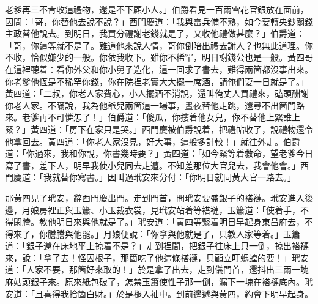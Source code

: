 老爹再三不肯收這禮物，還是不下顧小人。」伯爵看見一百兩雪花官銀放在面前，因問：「哥，你替他去說不說？」西門慶道：「我與雷兵備不熟，如今要轉央鈔關錢主政替他說去。到明日，我買分禮謝老錢就是了，又收他禮做甚麼？」伯爵道：「哥，你這等就不是了。難道他來說人情，哥你倒陪出禮去謝人？也無此道理。你不收，恰似嫌少的一般。你依我收下。雖你不稀罕，明日謝錢公也是一般。黃四哥在這裡聽着：看你外父和你小舅子造化，這一回求了書去，難得兩箇都沒事出來。你老爹他恆是不稀罕你錢，你在院裡老實大大擺一席酒，請俺們耍一日就是了。」{}黃四道：「二叔，你老人家費心，小人擺酒不消說，還叫俺丈人買禮來，磕頭酬謝你老人家。不瞞說，我為他爺兒兩箇這一場事，晝夜替他走跳，還尋不出箇門路來。老爹再不可憐怎了！」伯爵道：「傻瓜，你摟着他女兒，你不替他上緊誰上緊？」{}黃四道：「房下在家只是哭。」西門慶被伯爵說着，把禮帖收了，說禮物還令他拿回去。{}黃四道：「你老人家沒見，好大事，這般多計較！」就往外走。伯爵道：「你過來，我和你說，你書幾時要？」黃四道：「如今緊等着救命，望老爹今日寫了書，差下人，明早我使小兒同去走遭。不知差那位大官兒去，我會他會。」西門慶道：「我就替你寫書。」因叫過玳安來分付：「你明日就同黃大官一路去。」

那黃四見了玳安，辭西門慶出門。走到門首，問玳安要盛銀子的褡褳。玳安進入後邊，月娘房裡正與玉簫、小玉裁衣裳，見玳安站着等褡褳，玉簫道：「使着手，不得閑謄。教他明日來與他就是了。」玳安道：「黃四等緊着明日早起身東昌府去，不得來了，你謄謄與他罷。」月娘便說：「你拿與他就是了，只教人家等着。」玉簫道：「銀子還在床地平上掠着不是？」走到裡間，把銀子往床上只一倒，掠出褡褳來，說：「拿了去！怪囚根子，那箇吃了他這條褡褳，只顧立叮螞蝗的要！」玳安道：「人家不要，那箇好來取的！」於是拿了出去，走到儀門首，還抖出三兩一塊麻姑頭銀子來。{}原來紙包破了，怎禁玉簫使性子那一倒，漏下一塊在褡褳底內。玳安道：「且喜得我拾箇白財。」於是褪入袖中。{}到前邊遞與黃四，約會下明早起身。

